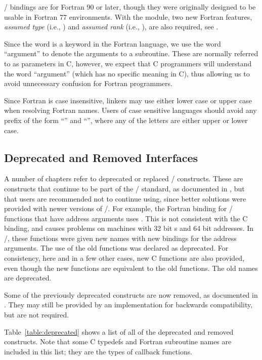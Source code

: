 \MPI/ bindings are for Fortran 90 or later,
though they were originally designed
to be usable in Fortran 77 environments.
With the  module, two new Fortran features,
\emph{assumed type} (i.e., ) and \emph{assumed rank}
(i.e., ), are also required,
see .

Since the word  is a keyword in the Fortran language, we use
the word ``argument'' to denote the arguments to a subroutine. These
are normally referred to as parameters in C, however, we
expect that C programmers will understand the word
``argument'' (which has no specific meaning in C), thus allowing
us to avoid unnecessary confusion for Fortran programmers.

Since Fortran is case insensitive, linkers may use either lower case
or upper case when resolving Fortran names.  Users of case sensitive
languages should avoid any prefix of the form ``'' and ``'',
where any of the letters are either upper or lower case.

\subsection{Deprecated and Removed Interfaces}
\label{sec:deprecated}
A number of chapters refer to deprecated or replaced \MPI/ constructs.
These are
constructs that continue to be part of the \MPI/ standard,
as documented in ,
but that users are recommended not to continue using, since
better solutions were provided with newer versions of \MPI/.
For example, the Fortran binding
for \mpii/ functions that have address arguments uses .
This is not consistent with the C binding, and causes problems on
machines with 32 bit s and 64 bit addresses.  In
\mpiii/, these functions
were given new names with
new bindings for the
address arguments.  The use of the old functions was declared as deprecated.
For consistency, here and
in
a few other cases, new C
functions are also provided, even though the new functions are
equivalent to the old functions.  The old names are deprecated.

Some of the previously deprecated constructs are now removed, as documented in
.
They may still be provided by an implementation for backwards compatibility, but are not required.

Table~\ref{table:deprecated} shows
a list of all of the deprecated and removed constructs.
Note that
some C typedefs and Fortran subroutine names are
included in this list; they are the types of callback functions.

